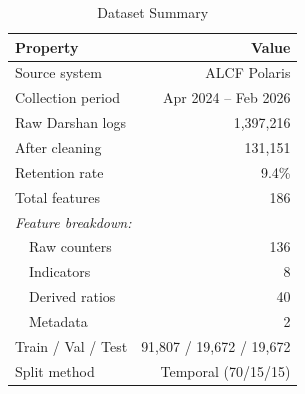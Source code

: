 \begin{table}[t]
\centering
\caption{Dataset Summary}
\label{tab:dataset}
\begin{tabular}{lr}
\toprule
\textbf{Property} & \textbf{Value} \\
\midrule
Source system & ALCF Polaris \\
Collection period & Apr 2024 -- Feb 2026 \\
Raw Darshan logs & 1,397,216 \\
After cleaning & 131,151 \\
Retention rate & 9.4\% \\
Total features & 186 \\
\midrule
\multicolumn{2}{l}{\textit{Feature breakdown:}} \\
~~Raw counters & 136 \\
~~Indicators & 8 \\
~~Derived ratios & 40 \\
~~Metadata & 2 \\
\midrule
Train / Val / Test & 91,807 / 19,672 / 19,672 \\
Split method & Temporal (70/15/15) \\
\bottomrule
\end{tabular}
\end{table}
